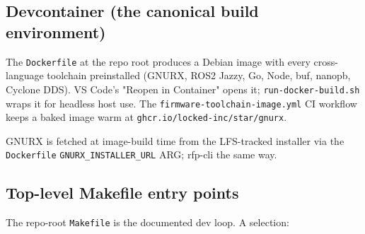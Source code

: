 \subsection{Devcontainer (the canonical build environment)}

The \texttt{Dockerfile} at the repo root produces a Debian image with
every cross-language toolchain preinstalled (GNURX, ROS2 Jazzy, Go,
Node, buf, nanopb, Cyclone DDS). VS Code's "Reopen in Container"
opens it; \texttt{run-docker-build.sh} wraps it for headless host use.
The \texttt{firmware-toolchain-image.yml} CI workflow keeps a baked
image warm at \texttt{ghcr.io/locked-inc/star/gnurx}.

GNURX is fetched at image-build time from the LFS-tracked installer
via the \texttt{Dockerfile} \texttt{GNURX\_INSTALLER\_URL} ARG; rfp-cli
the same way.

\subsection{Top-level Makefile entry points}

The repo-root \texttt{Makefile} is the documented dev loop. A
selection:

